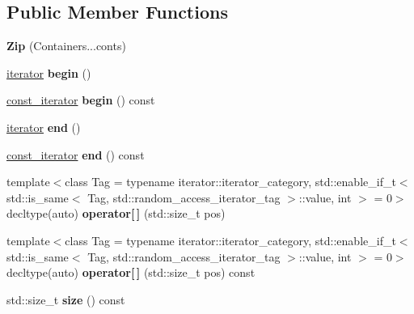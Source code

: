 \subsection*{Public Member Functions}
\begin{DoxyCompactItemize}
\item 
{\bfseries Zip} (Containers...\+conts)\hypertarget{classit_1_1Zip_a14e38c94da173e9c536bc8b430e36927}{}\label{classit_1_1Zip_a14e38c94da173e9c536bc8b430e36927}

\item 
\hyperlink{classit_1_1ZipIter}{iterator} {\bfseries begin} ()\hypertarget{classit_1_1Zip_af2e6f1d41c32c94a8b790a4870bd9340}{}\label{classit_1_1Zip_af2e6f1d41c32c94a8b790a4870bd9340}

\item 
\hyperlink{classit_1_1ZipIter}{const\+\_\+iterator} {\bfseries begin} () const \hypertarget{classit_1_1Zip_a1867c9ddfe0d78c7d6d826d6938ca7eb}{}\label{classit_1_1Zip_a1867c9ddfe0d78c7d6d826d6938ca7eb}

\item 
\hyperlink{classit_1_1ZipIter}{iterator} {\bfseries end} ()\hypertarget{classit_1_1Zip_aa9d9cb83973543f951a798e1052cc84a}{}\label{classit_1_1Zip_aa9d9cb83973543f951a798e1052cc84a}

\item 
\hyperlink{classit_1_1ZipIter}{const\+\_\+iterator} {\bfseries end} () const \hypertarget{classit_1_1Zip_aec064915b95a39b28b8eee0933c0ce5c}{}\label{classit_1_1Zip_aec064915b95a39b28b8eee0933c0ce5c}

\item 
{\footnotesize template$<$class Tag  = typename iterator\+::iterator\+\_\+category, std\+::enable\+\_\+if\+\_\+t$<$ std\+::is\+\_\+same$<$ Tag, std\+::random\+\_\+access\+\_\+iterator\+\_\+tag $>$\+::value, int $>$  = 0$>$ }\\decltype(auto) {\bfseries operator\mbox{[}$\,$\mbox{]}} (std\+::size\+\_\+t pos)\hypertarget{classit_1_1Zip_aae59d505eaa1faee985f0720253b2b0c}{}\label{classit_1_1Zip_aae59d505eaa1faee985f0720253b2b0c}

\item 
{\footnotesize template$<$class Tag  = typename iterator\+::iterator\+\_\+category, std\+::enable\+\_\+if\+\_\+t$<$ std\+::is\+\_\+same$<$ Tag, std\+::random\+\_\+access\+\_\+iterator\+\_\+tag $>$\+::value, int $>$  = 0$>$ }\\decltype(auto) {\bfseries operator\mbox{[}$\,$\mbox{]}} (std\+::size\+\_\+t pos) const \hypertarget{classit_1_1Zip_a925c92ad58f6c276c88559608efca86f}{}\label{classit_1_1Zip_a925c92ad58f6c276c88559608efca86f}

\item 
std\+::size\+\_\+t {\bfseries size} () const \hypertarget{classit_1_1Zip_a4a327ee188e189944c7f921c359ca2c8}{}\label{classit_1_1Zip_a4a327ee188e189944c7f921c359ca2c8}

\end{DoxyCompactItemize}
